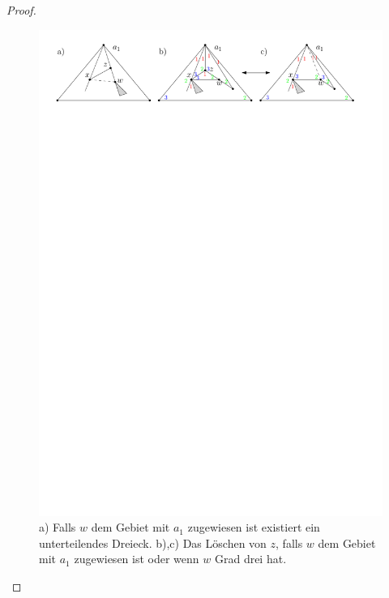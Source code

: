 \begin{proof}
\begin{description}[leftmargin =0pt, font = \bfseries]
\begin{figure}[h]
	\centering
	  \includegraphics[width=1\textwidth]{lem5_4.pdf}
\caption{a) Falls $w$ dem Gebiet mit $a_1$ zugewiesen ist existiert ein unterteilendes Dreieck. b),c) Das Löschen von $z$, falls $w$ dem Gebiet mit $a_1$ zugewiesen ist oder wenn $w$ Grad drei hat. }
    	\label{pic_lem5_4}
\end{figure}


\end{description}
\end{proof}
